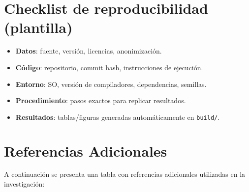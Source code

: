 \appendix
\section{Checklist de reproducibilidad (plantilla)}
\begin{itemize}[leftmargin=*]
  \item \textbf{Datos}: fuente, versión, licencias, anonimización.
  \item \textbf{Código}: repositorio, commit hash, instrucciones de ejecución.
  \item \textbf{Entorno}: SO, versión de compiladores, dependencias, semillas.
  \item \textbf{Procedimiento}: pasos exactos para replicar resultados.
  \item \textbf{Resultados}: tablas/figuras generadas automáticamente en \texttt{build/}.
\end{itemize}

\section{Referencias Adicionales}
A continuación se presenta una tabla con referencias adicionales utilizadas en la investigación:

